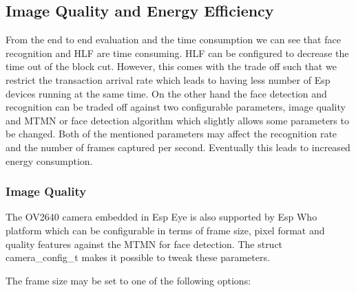 

\subsection{Image Quality and Energy Efficiency}

From the end to end evaluation and the time consumption we can see that face recognition and HLF are time consuming. HLF can be configured to decrease the time out of the block cut. However, this comes with the trade off such that we restrict the transaction arrival rate which leads to having less number of Esp devices running at the same time. 
On the other hand the face detection and recognition can be traded off against two configurable parameters, image quality and MTMN or face detection algorithm which slightly allows some parameters to be changed. Both of the mentioned parameters may affect the recognition rate and the number of frames captured per second. Eventually this leads to increased energy consumption. 

\subsubsection{Image Quality}

The OV2640 camera embedded in Esp Eye is also supported by Esp Who platform which can be configurable in terms of frame size, pixel format and quality features against the MTMN for face detection. The struct {\selectfont camera\_config\_t} makes it possible to tweak these parameters. 

The frame size may be set to one of the following options:

